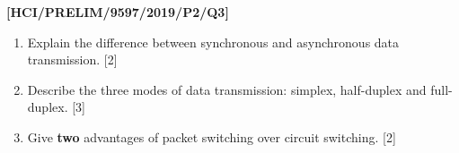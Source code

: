 \item \textbf{{[}HCI/PRELIM/9597/2019/P2/Q3{]} }
\begin{enumerate}
\item Explain the difference between synchronous and asynchronous data transmission.\hfill{}
{[}2{]}
\item Describe the three modes of data transmission: simplex, half-duplex
and full-duplex. \hfill{}{[}3{]}
\item Give \textbf{two} advantages of packet switching over circuit switching.\hfill{}
{[}2{]}
\end{enumerate}